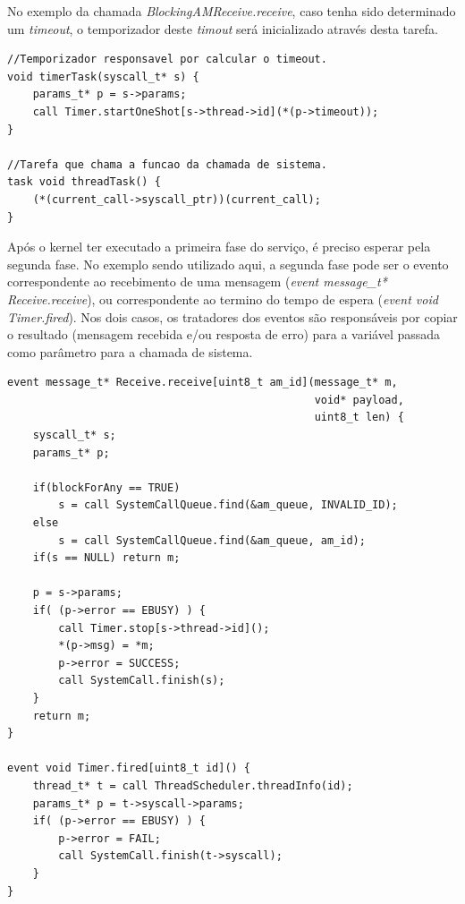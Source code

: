 No exemplo da chamada \textit{BlockingAMReceive.receive}, caso tenha sido determinado um \textit{timeout}, o temporizador deste
\textit{timout} será inicializado através desta tarefa.
\begin{lstlisting}
//Temporizador responsavel por calcular o timeout.
void timerTask(syscall_t* s) {
    params_t* p = s->params;
    call Timer.startOneShot[s->thread->id](*(p->timeout));  
}

//Tarefa que chama a funcao da chamada de sistema.
task void threadTask() {
    (*(current_call->syscall_ptr))(current_call);
}
\end{lstlisting}

Após o kernel ter executado a primeira fase do serviço, é preciso esperar pela segunda fase. No exemplo sendo utilizado
aqui, a segunda fase pode ser o evento correspondente ao recebimento de uma mensagem (\textit{event message\_t*
Receive.receive}), ou correspondente ao termino do tempo de espera (\textit{event void Timer.fired}).
Nos dois casos, os tratadores dos eventos são responsáveis por copiar o resultado (mensagem recebida e/ou resposta de
erro) para a variável passada como parâmetro para a chamada de sistema.
\begin{lstlisting}
event message_t* Receive.receive[uint8_t am_id](message_t* m,
                                                void* payload,
                                                uint8_t len) {
    syscall_t* s;
    params_t* p;

    if(blockForAny == TRUE)
        s = call SystemCallQueue.find(&am_queue, INVALID_ID);
    else
        s = call SystemCallQueue.find(&am_queue, am_id);
    if(s == NULL) return m;

    p = s->params;
    if( (p->error == EBUSY) ) {
        call Timer.stop[s->thread->id]();
        *(p->msg) = *m;
        p->error = SUCCESS;
        call SystemCall.finish(s);
    }
    return m;
}

event void Timer.fired[uint8_t id]() {
    thread_t* t = call ThreadScheduler.threadInfo(id);
    params_t* p = t->syscall->params;
    if( (p->error == EBUSY) ) {
        p->error = FAIL;
        call SystemCall.finish(t->syscall);
    }
}
\end{lstlisting}


